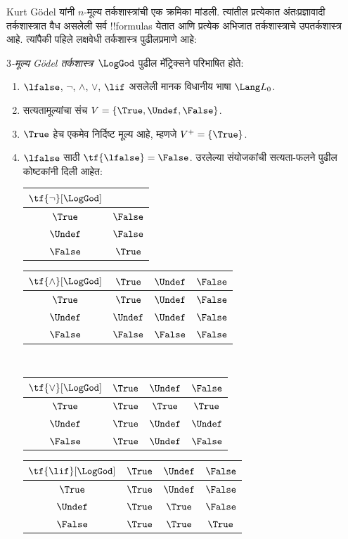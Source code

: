 \documentclass[../../../include/open-logic-section]{subfiles}
\begin{document}


Kurt G\"odel यांनी $n$-मूल्य तर्कशास्त्रांची एक क्रमिका
मांडली. त्यांतील प्रत्येकात अंतःप्रज्ञावादी तर्कशास्त्रात
वैध असलेली सर्व !!{formula}s येतात आणि प्रत्येक अभिजात
तर्कशास्त्राचे उपतर्कशास्त्र आहे. त्यांपैकी पहिले
लक्षवेधी तर्कशास्त्र पुढीलप्रमाणे आहे:

\begin{defn}
\emph{$3$-मूल्य G\"odel तर्कशास्त्र}~$\LogGod$ पुढील
मॅट्रिक्सने परिभाषित होते:
\begin{enumerate}
  \item $\lfalse$, $\lnot$, $\land$, $\lor$, $\lif$ असलेली मानक विधानीय भाषा $\Lang L_0$.
  \item सत्यतामूल्यांचा संच $V = \{\True, \Undef, \False\}$.
  \item $\True$ हेच एकमेव निर्दिष्ट मूल्य आहे, म्हणजे $V^+ = \{\True\}$.
  \item $\lfalse$ साठी $\tf{\lfalse} = \False$. उरलेल्या
  संयोजकांची सत्यता-फलने पुढील कोष्टकांनी दिली आहेत:
  \begin{center}
    \begin{tabular}{c|c}
      $\tf{\lnot}[\LogGod]$ & \\
      \hline
      $\True$ & $\False$ \\
      $\Undef$ & $\False$ \\
      $\False$ & $\True$
    \end{tabular}
    \quad
    \begin{tabular}{c|ccc}
      $\tf{\land}[\LogGod]$ & $\True$ & $\Undef$ & $\False$ \\
      \hline
      $\True$ & $\True$ & $\Undef$ & $\False$ \\
      $\Undef$ & $\Undef$ & $\Undef$ & $\False$\\
      $\False$ & $\False$ & $\False$ & $\False$
    \end{tabular}
    \\[2ex]
    \begin{tabular}{c|ccc}
      $\tf{\lor}[\LogGod]$ & $\True$ & $\Undef$ & $\False$ \\
      \hline
      $\True$ & $\True$ & $\True$ & $\True$ \\
      $\Undef$ & $\True$ & $\Undef$ & $\Undef$ \\
      $\False$ & $\True$ & $\Undef$ & $\False$
    \end{tabular}
    \quad
    \begin{tabular}{c|ccc}
      $\tf{\lif}[\LogGod]$ & $\True$ & $\Undef$ & $\False$ \\
      \hline
      $\True$ & $\True$ & $\Undef$ & $\False$ \\
      $\Undef$ & $\True$ & $\True$ & $\False$  \\
      $\False$ & $\True$ & $\True$ & $\True$
    \end{tabular}
  \end{center}
\end{enumerate}
\end{defn}
\end{document}
